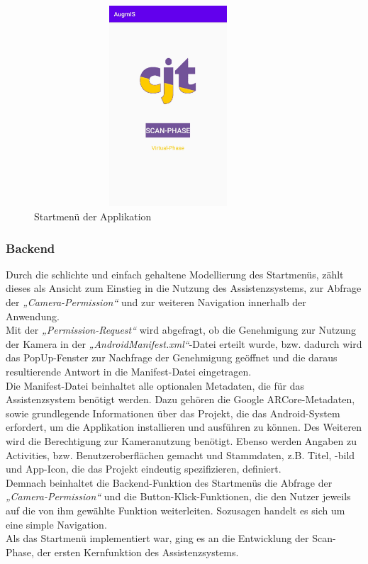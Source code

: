 \begin{figure}[hbt!]
    \centering
    \includegraphics[width=10cm,height=7.5cm,keepaspectratio]{4Umsetzung/Bilder/startmenu.jpg}
    \caption{Startmenü der Applikation}
    \label{pic:startmenu}
\end{figure}
\subsubsection{Backend}
Durch die schlichte und einfach gehaltene Modellierung des Startmenüs, zählt dieses als Ansicht zum Einstieg in die Nutzung des Assistenzsystems, zur Abfrage der 
\textit{„Camera-Permission“} und zur weiteren Navigation innerhalb der Anwendung.
\\ 
Mit der \textit{„Permission-Request“} wird abgefragt, ob die Genehmigung zur Nutzung der Kamera in der \textit{„AndroidManifest.xml“}-Datei erteilt wurde, bzw. 
dadurch wird das PopUp-Fenster zur Nachfrage der Genehmigung geöffnet und die daraus resultierende Antwort in die Manifest-Datei eingetragen. 
\\ 
\linebreak
Die Manifest-Datei beinhaltet alle optionalen Metadaten, die für das Assistenzsystem benötigt werden. Dazu gehören die Google ARCore-Metadaten, sowie 
grundlegende Informationen über das Projekt, die das Android-System erfordert, um die Applikation installieren und ausführen zu können. Des Weiteren wird 
die Berechtigung zur Kameranutzung benötigt. Ebenso werden Angaben zu Activities, bzw. Benutzeroberflächen gemacht und Stammdaten, z.B. Titel, -bild und 
App-Icon, die das Projekt eindeutig spezifizieren, definiert.
\\ 
\linebreak
Demnach beinhaltet die Backend-Funktion des Startmenüs die Abfrage der \textit{„Camera-Permission“} und die Button-Klick-Funktionen, die den Nutzer 
jeweils auf die von ihm gewählte Funktion weiterleiten. Sozusagen handelt es sich um eine simple Navigation.
\\ 
\linebreak
Als das Startmenü implementiert war, ging es an die Entwicklung der Scan-Phase, der ersten Kernfunktion des Assistenzsystems.

